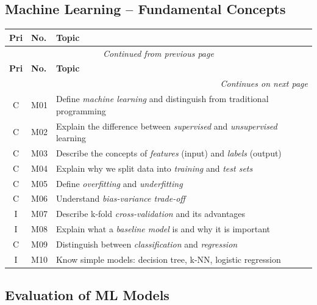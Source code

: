 \documentclass[11pt,a4paper]{article}
\begin{document}
\subsection{Machine Learning -- Fundamental Concepts}

\begin{longtable}{@{}clp{9cm}@{}}
\toprule
\textbf{Pri} & \textbf{No.} & \textbf{Topic} \\
\midrule
\endfirsthead
\multicolumn{3}{c}{\textit{Continued from previous page}} \\
\toprule
\textbf{Pri} & \textbf{No.} & \textbf{Topic} \\
\midrule
\endhead
\midrule
\multicolumn{3}{r}{\textit{Continues on next page}} \\
\endfoot
\bottomrule
\endlastfoot
C & M01 & Define \emph{machine learning} and distinguish from traditional programming \\
C & M02 & Explain the difference between \emph{supervised} and \emph{unsupervised} learning \\
C & M03 & Describe the concepts of \emph{features} (input) and \emph{labels} (output) \\
C & M04 & Explain why we split data into \emph{training} and \emph{test sets} \\
C & M05 & Define \emph{overfitting} and \emph{underfitting} \\
C & M06 & Understand \emph{bias-variance trade-off} \\
I & M07 & Describe k-fold \emph{cross-validation} and its advantages \\
I & M08 & Explain what a \emph{baseline model} is and why it is important \\
C & M09 & Distinguish between \emph{classification} and \emph{regression} \\
I & M10 & Know simple models: decision tree, k-NN, logistic regression \\
\end{longtable}

\subsection{Evaluation of ML Models}
\end{document}
